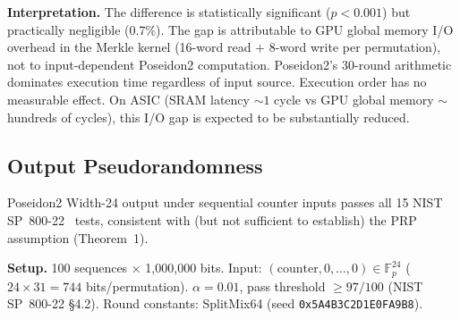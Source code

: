 \documentclass[11pt,a4paper]{article}
\begin{document}
\textbf{Interpretation.}
The difference is statistically significant ($p < 0.001$) but practically negligible (0.7\%). The gap is attributable to GPU global memory I/O overhead in the Merkle kernel (16-word read $+$ 8-word write per permutation), not to input-dependent Poseidon2 computation. Poseidon2's 30-round arithmetic dominates execution time regardless of input source. Execution order has no measurable effect. On ASIC (SRAM latency ${\sim}1$ cycle vs GPU global memory ${\sim}$hundreds of cycles), this I/O gap is expected to be substantially reduced.

\subsection{Output Pseudorandomness}
\label{sec:gpu-pseudorandom}

Poseidon2 Width-24 output under sequential counter inputs passes all 15 NIST SP~800-22~\cite{nist80022} tests, consistent with (but not sufficient to establish) the PRP assumption (Theorem~1).

\textbf{Setup.} 100 sequences $\times$ 1,000,000 bits. Input: $(\mathrm{counter}, 0, \ldots, 0) \in \mathbb{F}_p^{24}$ ($24 \times 31 = 744$ bits/permutation). $\alpha = 0.01$, pass threshold $\geq 97/100$ (NIST SP~800-22 \S4.2). Round constants: SplitMix64 (seed \texttt{0x5A4B3C2D1E0FA9B8}).
\end{document}
